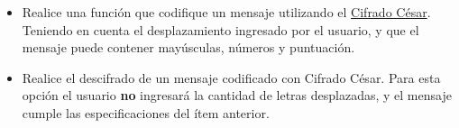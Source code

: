 \begin{itemize}
    \item Realice una función que codifique un mensaje utilizando el \textcolor{cyan}{\href{https://es.wikipedia.org/wiki/Cifrado_C\%C3\%A9sar}{Cifrado César}}. Teniendo en cuenta el desplazamiento ingresado por el usuario, y que el mensaje puede contener mayúsculas, números y puntuación.
    \item Realice el descifrado de un mensaje codificado con Cifrado César. Para esta opción el usuario \textbf{no} ingresará la cantidad de letras desplazadas, y el mensaje cumple las especificaciones del ítem anterior.
\end{itemize}
